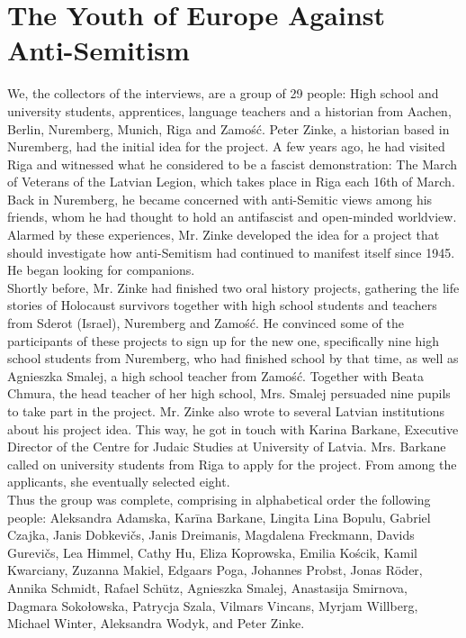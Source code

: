 \section*{The Youth of Europe Against Anti-Semitism} 

  
We, the collectors of the interviews, are a group of 29 people: High school and university students, apprentices, language teachers and a historian from Aachen, Berlin, Nuremberg, Munich, Riga and Zamość. Peter Zinke, a historian based in Nuremberg, had the initial idea for the project. A few years ago, he had visited Riga and witnessed what he considered to be a fascist demonstration: The March of Veterans of the Latvian Legion, which takes place in Riga each 16th of March. \\
Back in Nuremberg, he became concerned with anti-Semitic views among his friends, whom he had thought to hold an antifascist and open-minded worldview. Alarmed by these experiences, Mr. Zinke developed the idea for a project that should investigate how anti-Semitism had continued to manifest itself since 1945. He began looking for companions. \\
Shortly before, Mr. Zinke had finished two oral history projects, gathering the life stories of Holocaust survivors together with high school students and teachers from Sderot (Israel), Nuremberg and Zamość. He convinced some of the participants of these projects to sign up for the new one, specifically nine high school students from Nuremberg, who had finished school by that time, as well as Agnieszka Smalej, a high school teacher from Zamość. Together with Beata Chmura, the head teacher of her high school, Mrs. Smalej persuaded nine pupils to take part in the project. Mr. Zinke also wrote to several Latvian institutions about his project idea. This way, he got in touch with Karina Barkane, Executive Director of the Centre for Judaic Studies at University of Latvia. Mrs. Barkane called on university students from Riga to apply for the project. From among the applicants, she eventually selected eight.  \\
Thus the group was complete, comprising in alphabetical order the following people: Aleksandra Adamska, Karīna Barkane, Lingita Lina Bopulu, Gabriel Czajka, Janis Dobkevičs, Janis Dreimanis, Magdalena Freckmann, Davids Gurevičs, Lea Himmel, Cathy Hu, Eliza Koprowska, Emilia Kościk, Kamil Kwarciany, Zuzanna Makiel, Edgaars Poga, Johannes Probst, Jonas Röder, Annika Schmidt, Rafael Schütz, Agnieszka Smalej, Anastasija Smirnova, Dagmara Sokołowska, Patrycja Szala, Vilmars Vincans, Myrjam Willberg, Michael Winter, Aleksandra Wodyk, and Peter Zinke. \\
